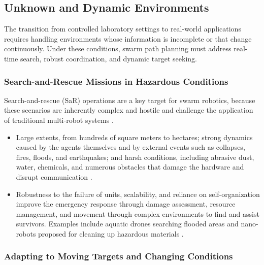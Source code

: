 \subsection{Unknown and Dynamic Environments}

The transition from controlled laboratory settings to real-world applications
requires handling environments whose information is incomplete or that change
continuously. Under these conditions, swarm path planning must address real-time
search, robust coordination, and dynamic target seeking.

\subsubsection{Search-and-Rescue Missions in Hazardous Conditions}

Search-and-rescue (SaR) operations are a key target for swarm robotics, because
these scenarios are inherently complex and hostile and challenge the application
of traditional multi-robot systems \cite{tan2016handbook}.
\begin{itemize}
  \item {} Large extents, from hundreds
        of square meters to hectares; strong dynamics caused by the agents
        themselves and by external events such as collapses, fires, floods, and
        earthquakes; and harsh conditions, including abrasive dust, water,
        chemicals, and numerous obstacles that damage the hardware and disrupt
        communication \cite{tan2016handbook}.
  \item {} Robustness to the failure of units,
        scalability, and reliance on self-organization improve the emergency
        response through damage assessment, resource management, and movement
        through complex environments to find and assist survivors. Examples
        include aquatic drones searching flooded areas and nano-robots proposed
        for cleaning up hazardous materials \cite{bhowmick2024bio}.
\end{itemize}

\subsubsection{Adapting to Moving Targets and Changing Conditions}

